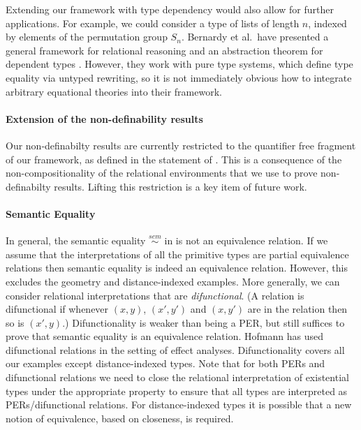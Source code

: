 Extending our framework with type dependency would also allow for
further applications. For example, we could consider a type of lists
of length $n$, indexed by elements of the permutation group
$S_n$. Bernardy et al.~have presented a general framework for
relational reasoning and an abstraction theorem for dependent types
\cite{bernardy12proofs}. However, they work with pure type systems,
which define type equality via untyped rewriting, so it is not
immediately obvious how to integrate arbitrary equational theories
into their framework.

\paragraph{Extension of the non-definability results} Our
non-definabilty results are currently restricted to the quantifier
free fragment of our framework, as defined in the statement of
. This is a consequence of the
non-compositionality of the relational environments that we use to
prove non-definabilty results. Lifting this restriction is a key item
of future work.

\paragraph{Semantic Equality} In general, the semantic equality
$\stackrel{sem}\sim$ in  is not an
equivalence relation. If we assume that the interpretations of all the
primitive types are partial equivalence relations then semantic
equality is indeed an equivalence relation. However, this excludes the
geometry and distance-indexed examples. More generally, we can
consider relational interpretations that are \emph{difunctional}. (A
relation is difunctional if whenever $(x,y)$, $(x',y')$ and $(x,y')$
are in the relation then so is $(x',y)$.) Difunctionality is weaker
than being a PER, but still suffices to prove that semantic equality
is an equivalence relation. Hofmann \cite{hofmann08correctness} has
used difunctional relations in the setting of effect
analyses. Difunctionality covers all our examples except
distance-indexed types. Note that for both PERs and difunctional
relations we need to close the relational interpretation of
existential types under the appropriate property to ensure that all
types are interpreted as PERs/difunctional relations. For
distance-indexed types it is possible that a new notion of
equivalence, based on closeness, is required.

